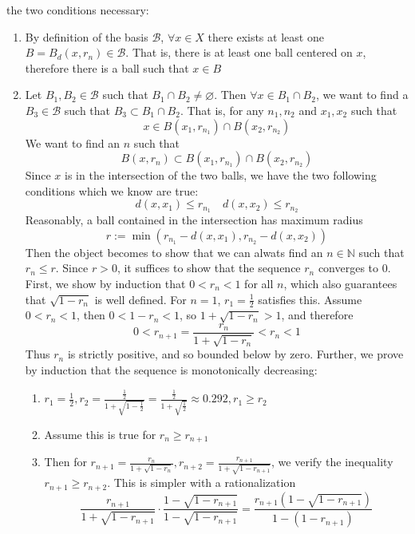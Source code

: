 \documentclass{article} %
\begin{document}
the two conditions necessary:
\begin{enumerate}
\item By definition of the basis $\mathcal{B}$, $\forall x \in X$
  there exists at least one $B = B_d(x, r_n) \in \mathcal{B}$. That
  is, there is at least one ball centered on $x$, therefore there is
  a ball such that $x \in B$
\item Let $B_1, B_2 \in \mathcal{B}$ such that $B_1 \cap B_2 \neq
  \varnothing$. Then $\forall x \in B_1 \cap B_2$, we want to find a
  $B_3 \in \mathcal{B}$ such that $B_3 \subset B_1 \cap B_2$. That
  is, for any $n_1, n_2$ and $x_1, x_2$ such that
  \[
    x \in B(x_1, r_{n_1}) \cap B(x_2, r_{n_2})
  \]
  We want to find an $n$ such that
  $$
  B(x, r_n) \subset B(x_1, r_{n_1}) \cap B(x_2, r_{n_2})
  $$
  Since $x$ is in the intersection of the two balls, we have the two
  following conditions which we know are true:
  \[
    d(x, x_1) \leq r_{n_1} \quad d(x,x_2) \leq r_{n_2}
  \]
  Reasonably, a ball contained in the intersection has maximum radius
  \[
    r := \min(r_{n_1} - d(x,x_1), r_{n_2} -d(x,x_2))
  \]
  Then the object becomes to show that we can alwats find an $n \in
  \mathbb{N}$ such that $r_n \le r$. Since $r > 0$, it suffices to
  show that the sequence $r_n$ converges to $0$. First, we show by
  induction that $0 < r_n < 1$ for all $n$, which also guarantees that
  $\sqrt{1 - r_n}$ is well defined. For $n = 1$, $r_1 = \frac{1}{2}$
  satisfies this. Assume $0 < r_n < 1$, then $0 < 1 - r_n < 1$, so
  $1 + \sqrt{1 - r_n} > 1$, and therefore
  \[
    0 < r_{n+1} = \frac{r_n}{1 + \sqrt{1 - r_n}} < r_n < 1
  \]
  Thus $r_n$ is strictly positive, and so bounded below by zero. Further, we
  prove by induction that the sequence is monotonically decreasing:
  \begin{enumerate}
    \item $r_1 = \frac{1}{2}, r_2 =
      \frac{\frac{1}{2}}{1+\sqrt{1-\frac{1}{2}}} =
      \frac{\frac{1}{2}}{1+\sqrt{\frac{1}{2}}} \approx 0.292, r_1 \ge r_2$
    \item Assume this is true for $r_{n} \ge r_{n+1}$
    \item Then for $r_{n+1} = \frac{r_n}{1+\sqrt{1-r_n}}, r_{n+2} =
      \frac{r_{n+1}}{1+\sqrt{1-r_{n+1}}}$, we verify the inequality
      $r_{n+1} \ge r_{n+2}$. This is simpler with a rationalization
      \[
        \frac{r_{n+1}}{1 + \sqrt{1 - r_{n+1}}} \cdot \frac{1 -
        \sqrt{1 - r_{n+1}}}{1 - \sqrt{1 - r_{n+1}}}
        = \frac{r_{n+1}\left(1 - \sqrt{1 - r_{n+1}}\right)}{1 -
        \left(1 - r_{n+1}\right)}
\]
\end{enumerate}
\end{enumerate}
\end{document}
